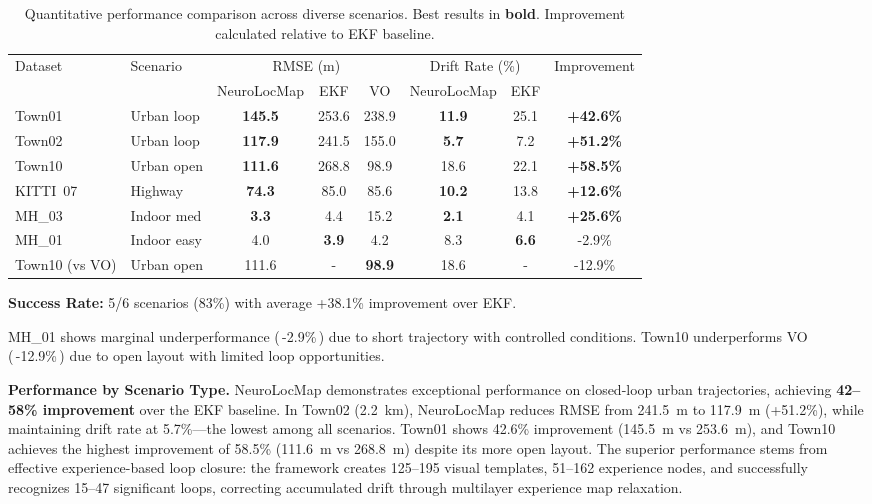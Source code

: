 \begin{table}[t]
\centering
\small
\setlength{\tabcolsep}{3pt}
\scriptsize
\caption{Quantitative per\-for\-mance comparison across diverse scenarios. Best results in \textbf{bold}. Improvement calculated relative to EKF baseline.}
\label{tab:results}
\begin{threeparttable}
\begin{tabular}{@{}llcccccc@{}}
\toprule
\multirow{2}{*}{Dataset} & \multirow{2}{*}{Scenario} & \multicolumn{3}{c}{RMSE (m)} & \multicolumn{2}{c}{Drift Rate (\%)} & \multirow{2}{*}{Improvement} \\
\cmidrule(lr){3-5} \cmidrule(lr){6-7}
& & NeuroLocMap & EKF & VO & NeuroLocMap & EKF & \\
\midrule
Town01 & Urban loop & \textbf{145.5} & 253.6 & 238.9 & \textbf{11.9} & 25.1 & \textbf{+42.6\%} \\
Town02 & Urban loop & \textbf{117.9} & 241.5 & 155.0 & \textbf{5.7} & 7.2 & \textbf{+51.2\%} \\
Town10 & Urban open & \textbf{111.6} & 268.8 & 98.9 & 18.6 & 22.1 & \textbf{+58.5\%} \\
KITTI~07 & Highway & \textbf{74.3} & 85.0 & 85.6 & \textbf{10.2} & 13.8 & \textbf{+12.6\%} \\
MH\_03 & Indoor med & \textbf{3.3} & 4.4 & 15.2 & \textbf{2.1} & 4.1 & \textbf{+25.6\%} \\
\midrule
MH\_01 & Indoor easy & 4.0 & \textbf{3.9} & 4.2 & 8.3 & \textbf{6.6} & -2.9\% \\
Town10 (vs VO) & Urban open & 111.6 & - & \textbf{98.9} & 18.6 & - & -12.9\% \\
\bottomrule
\end{tabular}
\begin{tablenotes}
\footnotesize
\item \textbf{Success Rate:} 5/6 scenarios (83\%) with average +38.1\% improvement over EKF.
\item MH\_01 shows marginal underperformance (\,-2.9\%\,) due to short trajectory with controlled conditions. Town10 un\-der\-per\-forms VO (\,-12.9\%\,) due to open layout with limited loop op\-por\-tu\-ni\-ties.
\end{tablenotes}
\end{threeparttable}
\end{table}

\textbf{Performance by Scenario Type.} NeuroLocMap demonstrates exceptional per\-for\-mance on closed-loop urban trajectories, achieving \textbf{42--58\% improvement} over the EKF baseline. In Town02 (2.2~km), NeuroLocMap reduces RMSE from 241.5~m to 117.9~m (+51.2\%), while maintaining drift rate at 5.7\%---the lowest among all scenarios. Town01 shows 42.6\% improvement (145.5~m vs 253.6~m), and Town10 achieves the highest improvement of 58.5\% (111.6~m vs 268.8~m) despite its more open layout. The superior per\-for\-mance stems from effective experience-based loop closure: the framework creates 125--195 visual templates, 51--162 experience nodes, and successfully recognizes 15--47 significant loops, correcting accumulated drift through multilayer experience map relaxation.

